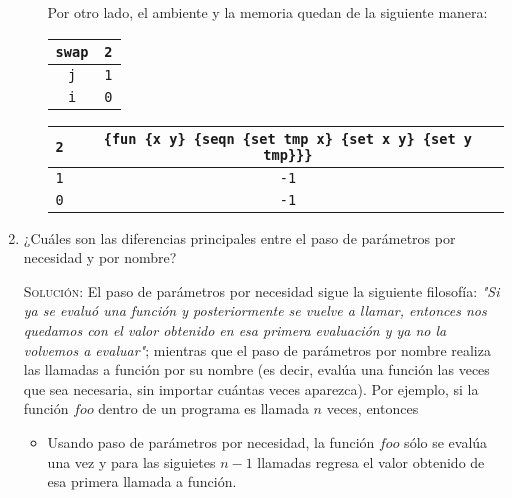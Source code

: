 \documentclass[letterpaper,11pt]{article}
\begin{document}
\begin{enumerate}
\begin{itemize}
        \newpage
        Por otro lado, el ambiente y la memoria quedan de la siguiente manera:
        \begin{table}[h]
            \parbox{.30\linewidth}{
            \centering
            \begin{tabular}{|c|c|}
            \hline
            \texttt{swap} & \texttt{2} \\
            \hline
            \texttt{j} & \texttt{1} \\
            \hline
            \texttt{i} & \texttt{0} \\
            \hline
            \end{tabular}
            }
            \hfill
            \parbox{.67\linewidth}{
            \centering
            \begin{tabular}{|c|c|}
            \hline
            \texttt{2} & \texttt{\{fun \{x y\} \{seqn \{set tmp x\}
                  \{set x y\}
                  \{set y tmp\}\}\}} \\
            \hline
            \texttt{1} & \texttt{-1} \\
            \hline
            \texttt{0} & \texttt{-1} \\
            \hline
            \end{tabular}
            }
        \end{table}
    \end{itemize}

    \item ¿Cuáles son las diferencias principales entre el paso de parámetros
    por necesidad y por nombre?

    \textsc{Solución:} El paso de parámetros por necesidad sigue la siguiente 
    filosofía: \textit{"Si ya se evaluó una función y posteriormente se vuelve 
    a llamar, entonces nos quedamos con el valor obtenido en esa primera 
    evaluación y ya no la volvemos a evaluar"}; mientras que el paso de 
    parámetros por nombre realiza las llamadas a función por su nombre (es 
    decir, evalúa una función las veces que sea necesaria, sin importar 
    cuántas veces aparezca). Por ejemplo, si la función $foo$ dentro de un 
    programa es llamada $n$ veces, entonces
    \begin{itemize}
        \item Usando paso de parámetros por necesidad, la función $foo$ sólo 
        se evalúa una vez y para las siguietes $n-1$ llamadas regresa el 
        valor obtenido de esa primera llamada a función.
        

\end{itemize}
\end{enumerate}
\end{document}
